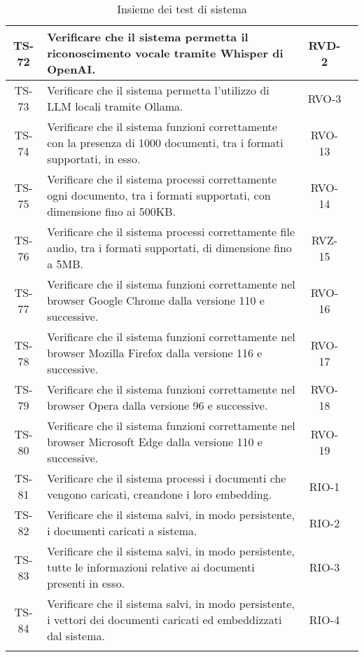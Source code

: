 \begin{xltabular}{\textwidth}{| c | X | c | c |}
    \hline
    TS-72 & Verificare che il sistema permetta il riconoscimento vocale tramite Whisper di OpenAI. & RVD-2 & \textcolor{xmarkcolor}{}\\
    \hline
    TS-73 & Verificare che il sistema permetta l'utilizzo di LLM locali tramite Ollama. & RVO-3 & \textcolor{cmarkcolor}{} \\
    \hline
    TS-74 & Verificare che il sistema funzioni correttamente con la presenza di 1000 documenti, tra i formati supportati, in esso. & RVO-13 & \textcolor{cmarkcolor}{}\\
    \hline
    TS-75 & Verificare che il sistema processi correttamente ogni documento, tra i formati supportati, con dimensione fino ai 500KB. & RVO-14 & \textcolor{cmarkcolor}{} \\
    \hline
    TS-76 & Verificare che il sistema processi correttamente file audio, tra i formati supportati, di dimensione fino a 5MB. & RVZ-15 & \textcolor{cmarkcolor}{} \\
    \hline
    TS-77 & Verificare che il sistema funzioni correttamente nel browser Google Chrome dalla versione 110 e successive. & RVO-16 & \textcolor{cmarkcolor}{} \\
    \hline
    TS-78 & Verificare che il sistema funzioni correttamente nel browser Mozilla Firefox dalla versione 116 e successive. & RVO-17 & \textcolor{cmarkcolor}{} \\
    \hline
    TS-79 & Verificare che il sistema funzioni correttamente nel browser Opera dalla versione 96 e successive. & RVO-18 & \textcolor{cmarkcolor}{} \\
    \hline
    TS-80 & Verificare che il sistema funzioni correttamente nel browser Microsoft Edge dalla versione 110 e successive. & RVO-19 & \textcolor{cmarkcolor}{} \\
    \hline
    TS-81 & Verificare che il sistema processi i documenti che vengono caricati, creandone i loro embedding. & RIO-1 & \textcolor{cmarkcolor}{} \\
    \hline
    TS-82 & Verificare che il sistema salvi, in modo persistente, i documenti caricati a sistema. & RIO-2 & \textcolor{cmarkcolor}{} \\
    \hline
    TS-83 & Verificare che il sistema salvi, in modo persistente, tutte le informazioni relative ai documenti presenti in esso. & RIO-3 & \textcolor{cmarkcolor}{} \\
    \hline
    TS-84 & Verificare che il sistema salvi, in modo persistente, i vettori dei documenti caricati ed embeddizzati dal sistema. & RIO-4 & \textcolor{cmarkcolor}{} \\
    \hline
     \caption{Insieme dei test di sistema}
    \label{tab:test}
\end{xltabular}
\endgroup

